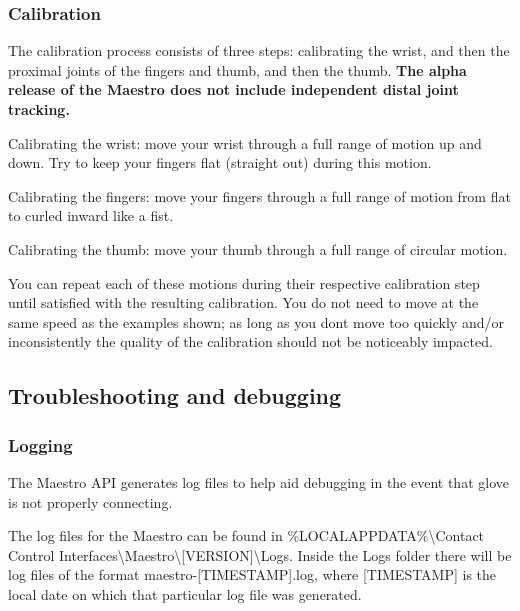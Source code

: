 \subsubsection*{Calibration}

The calibration process consists of three steps\+: calibrating the wrist, and then the proximal joints of the fingers and thumb, and then the thumb. {\bfseries The alpha release of the Maestro does not include independent distal joint tracking.}


\begin{DoxyEnumerate}
\item Calibrating the wrist\+: move your wrist through a full range of motion up and down. Try to keep your fingers flat (straight out) during this motion. 
\item Calibrating the fingers\+: move your fingers through a full range of motion from flat to curled inward like a fist. 
\item Calibrating the thumb\+: move your thumb through a full range of circular motion. 
\end{DoxyEnumerate}

You can repeat each of these motions during their respective calibration step until satisfied with the resulting calibration. You do not need to move at the same speed as the examples shown; as long as you don\textquotesingle{}t move too quickly and/or inconsistently the quality of the calibration should not be noticeably impacted.

\subsection*{Troubleshooting and debugging}

\subsubsection*{Logging}

The Maestro A\+PI generates log files to help aid debugging in the event that glove is not properly connecting.

The log files for the Maestro can be found in {\ttfamily \%L\+O\+C\+A\+L\+A\+P\+P\+D\+A\+TA\%\textbackslash{}Contact Control Interfaces\textbackslash{}Maestro\textbackslash{}\mbox{[}V\+E\+R\+S\+I\+ON\mbox{]}\textbackslash{}Logs}. Inside the {\ttfamily Logs} folder there will be log files of the format {\ttfamily maestro-\/\mbox{[}T\+I\+M\+E\+S\+T\+A\+MP\mbox{]}.log}, where {\ttfamily \mbox{[}T\+I\+M\+E\+S\+T\+A\+MP\mbox{]}} is the local date on which that particular log file was generated.

